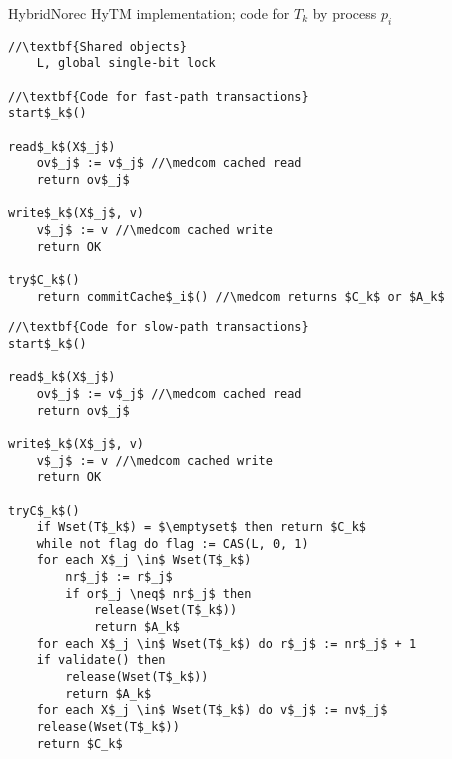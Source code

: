 \begin{algorithm*}[!h]
\caption{HybridNorec HyTM implementation; code for $T_k$ by process $p_i$}
\label{alg:inswrite3}
\vspace{-1mm}
\noindent\lstset{style=customc}
\begin{minipage}{0.49\textwidth}
\begin{lstlisting}[frame=none,firstnumber=1,mathescape=true]
//\textbf{Shared objects}
    L, global single-bit lock

//\textbf{Code for fast-path transactions}
start$_k$()
    
read$_k$(X$_j$)
    ov$_j$ := v$_j$ //\medcom cached read
    return ov$_j$

write$_k$(X$_j$, v)
    v$_j$ := v //\medcom cached write
    return OK

try$C_k$()
    return commitCache$_i$() //\medcom returns $C_k$ or $A_k$
\end{lstlisting}
\end{minipage}
\begin{minipage}{0.49\textwidth}
\begin{lstlisting}[frame=none,firstnumber=last,mathescape=true]
//\textbf{Code for slow-path transactions}
start$_k$()
    
read$_k$(X$_j$)
    ov$_j$ := v$_j$ //\medcom cached read
    return ov$_j$

write$_k$(X$_j$, v)
    v$_j$ := v //\medcom cached write
    return OK

tryC$_k$()
    if Wset(T$_k$) = $\emptyset$ then return $C_k$
    while not flag do flag := CAS(L, 0, 1)
    for each X$_j \in$ Wset(T$_k$)
        nr$_j$ := r$_j$
        if or$_j \neq$ nr$_j$ then
            release(Wset(T$_k$))
            return $A_k$
    for each X$_j \in$ Wset(T$_k$) do r$_j$ := nr$_j$ + 1
    if validate() then
        release(Wset(T$_k$))
        return $A_k$
    for each X$_j \in$ Wset(T$_k$) do v$_j$ := nv$_j$
    release(Wset(T$_k$))
    return $C_k$
\end{lstlisting}
\end{minipage}
\vspace{-1mm}
\end{algorithm*}

